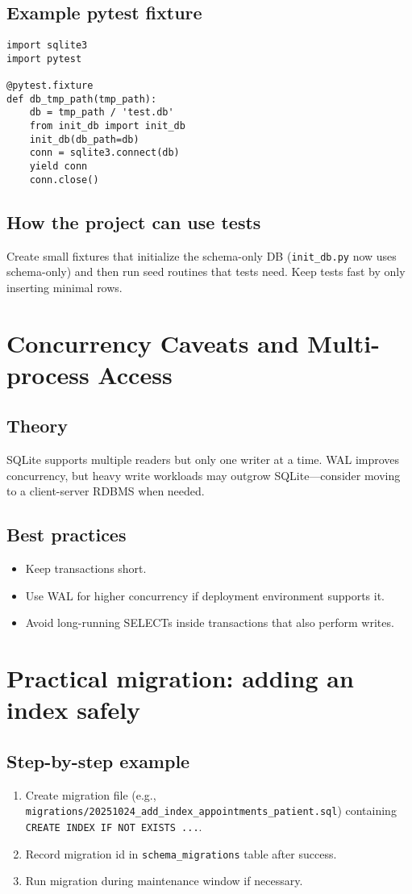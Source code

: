 \documentclass[11pt,a4paper]{article}
\begin{document}
\subsection{Example pytest fixture}
\begin{lstlisting}
import sqlite3
import pytest

@pytest.fixture
def db_tmp_path(tmp_path):
    db = tmp_path / 'test.db'
    from init_db import init_db
    init_db(db_path=db)
    conn = sqlite3.connect(db)
    yield conn
    conn.close()
\end{lstlisting}

\subsection{How the project can use tests}
Create small fixtures that initialize the schema-only DB (\texttt{init_db.py} now uses schema-only) and then run seed routines that tests need. Keep tests fast by only inserting minimal rows.

\section{Concurrency Caveats and Multi-process Access}
\subsection{Theory}
SQLite supports multiple readers but only one writer at a time. WAL improves concurrency, but heavy write workloads may outgrow SQLite—consider moving to a client-server RDBMS when needed.

\subsection{Best practices}
\begin{itemize}
  \item Keep transactions short.
  \item Use WAL for higher concurrency if deployment environment supports it.
  \item Avoid long-running SELECTs inside transactions that also perform writes.
\end{itemize}

\section{Practical migration: adding an index safely}
\subsection{Step-by-step example}
\begin{enumerate}
  \item Create migration file (e.g., \texttt{migrations/20251024_add_index_appointments_patient.sql}) containing \texttt{CREATE INDEX IF NOT EXISTS ...}.
  \item Record migration id in \texttt{schema_migrations} table after success.
  \item Run migration during maintenance window if necessary.
\end{enumerate}
\end{document}
